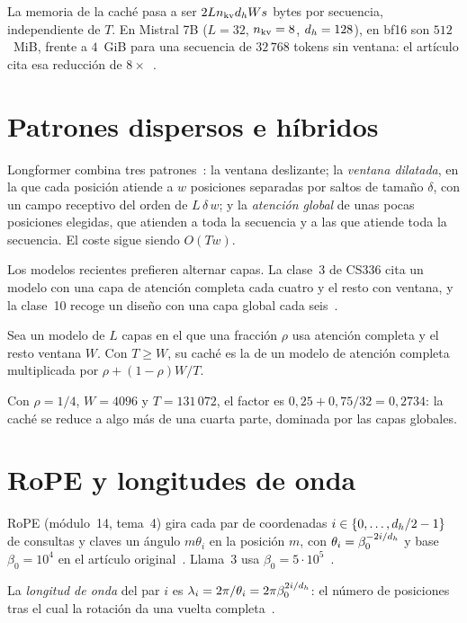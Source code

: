 La memoria de la caché pasa a ser $2Ln_{\mathrm{kv}}d_{h} Ws$ bytes por secuencia, independiente de $T$. En Mistral 7B ($L=32$, $n_{\mathrm{kv}}=8$, $d_{h}=128$), en bf16 son $512$~MiB, frente a $4$~GiB para una secuencia de $32\,768$ tokens sin ventana: el artículo cita esa reducción de $8\times$~\cite[§2]{mistral}.

\section{Patrones dispersos e híbridos}

Longformer combina tres patrones~\cite[§3.1]{longformer}: la ventana deslizante; la \emph{ventana dilatada}, en la que cada posición atiende a $w$ posiciones separadas por saltos de tamaño $\delta$, con un campo receptivo del orden de $L\,\delta\,w$; y la \emph{atención global} de unas pocas posiciones elegidas, que atienden a toda la secuencia y a las que atiende toda la secuencia. El coste sigue siendo $O(Tw)$.

Los modelos recientes prefieren alternar capas. La clase~3 de CS336 cita un modelo con una capa de atención completa cada cuatro y el resto con ventana, y la clase~10 recoge un diseño con una capa global cada seis~\cite{cs336}.

\begin{proposicion}\label{prop:hibrido}
Sea un modelo de $L$ capas en el que una fracción $\rho$ usa atención completa y el resto ventana $W$. Con $T\ge W$, su caché es la de un modelo de atención completa multiplicada por $\rho+(1-\rho)W/T$.
\end{proposicion}

Con $\rho=1/4$, $W=4096$ y $T=131\,072$, el factor es $0{,}25+0{,}75/32=0{,}2734$: la caché se reduce a algo más de una cuarta parte, dominada por las capas globales.

\section{RoPE y longitudes de onda}

RoPE (módulo~14, tema~4) gira cada par de coordenadas $i\in\{0,\dots,d_{h}/2-1\}$ de consultas y claves un ángulo $m\theta_i$ en la posición $m$, con $\theta_i=\beta_0^{-2i/d_{h}}$ y base $\beta_0=10^{4}$ en el artículo original~\cite[§3.2.2]{roformer}. Llama~3 usa $\beta_0=5\cdot 10^{5}$~\cite[tabla~3]{llama3}.

\begin{definicion}\label{def:onda}
La \emph{longitud de onda} del par $i$ es $\lambda_i=2\pi/\theta_i=2\pi\beta_0^{2i/d_{h}}$: el número de posiciones tras el cual la rotación da una vuelta completa~\cite[ec.~8]{yarn}.
\end{definicion}

